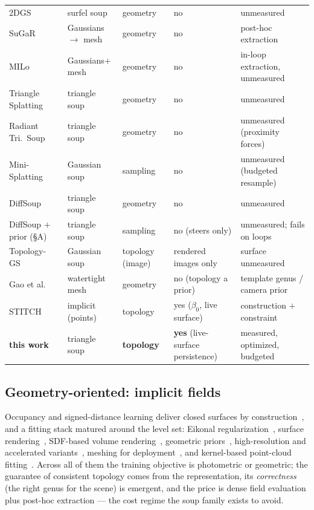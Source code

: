 \begin{table}[t]
\begin{tabular}{lllll}
2DGS~\citep{huang20242dgs} & surfel soup & geometry & no & unmeasured \\
SuGaR~\citep{guedon2024sugar} & Gaussians $\to$ mesh & geometry & no & post-hoc extraction \\
MILo~\citep{guedon2025milo} & Gaussians$+$mesh & geometry & no & in-loop extraction, unmeasured \\
Triangle Splatting~\citep{held2025trianglesplatting} & triangle soup & geometry & no & unmeasured \\
Radiant Tri.\ Soup~\citep{burgdorfer2025radiant} & triangle soup & geometry & no & unmeasured (proximity forces) \\
Mini-Splatting~\citep{fang2024minisplatting} & Gaussian soup & sampling & no & unmeasured (budgeted resample) \\
DiffSoup~\citep{tojo2026diffsoup} & triangle soup & geometry & no & unmeasured \\
DiffSoup $+$ prior (\S A) & triangle soup & sampling & no (steers only) & unmeasured; fails on loops \\
\midrule
Topology-GS~\citep{shen2025topologygs} & Gaussian soup & topology (image) & rendered images only & surface unmeasured \\
Gao et al.~\citep{gao2025genus,gao2026homology} & watertight mesh & geometry & no (topology a prior) & template genus / camera prior \\
STITCH~\citep{jignasu2024stitch} & implicit (points) & topology & yes ($\beta_0$, live surface) & construction $+$ constraint \\
\textbf{this work} & triangle soup & \textbf{topology} & \textbf{yes} (live-surface persistence) & measured, optimized, budgeted \\
\bottomrule
\end{tabular}
\end{table}

\subsection{Geometry-oriented: implicit fields}
Occupancy and signed-distance learning deliver closed surfaces by
construction~\citep{mescheder2019occupancy,park2019deepsdf,peng2020convoccnet},
and a fitting stack matured around the level set: Eikonal
regularization~\citep{gropp2020igr}, surface
rendering~\citep{yariv2020idr,oechsle2021unisurf}, SDF-based volume
rendering~\citep{yariv2021volsdf,wang2021neus}, geometric
priors~\citep{yu2022monosdf}, high-resolution and accelerated
variants~\citep{li2023neuralangelo,wang2023neus2,muller2022instantngp},
meshing for deployment~\citep{yariv2023bakedsdf}, and kernel-based
point-cloud fitting~\citep{huang2023nksr}. Across all of them the
training objective is photometric or geometric; the guarantee of
consistent topology comes from the representation, its \emph{correctness}
(the right genus for the scene) is emergent, and the price is dense
field evaluation plus post-hoc extraction --- the cost regime the
soup family exists to avoid.

